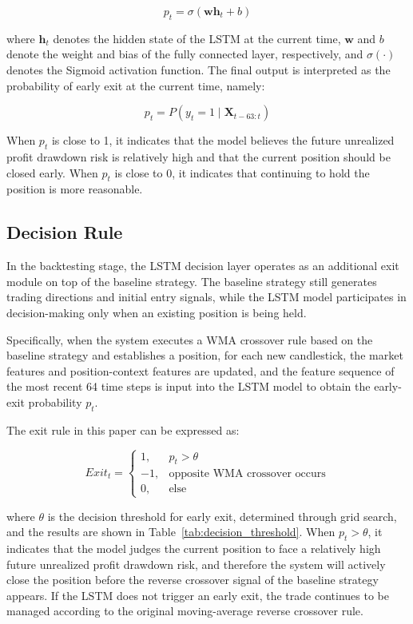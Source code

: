 \documentclass[12pt]{article}
\begin{document}
\begin{equation}
    p_t = \sigma(\mathbf{w}\mathbf{h}_t + b)
\end{equation}

where $\mathbf{h}_t$ denotes the hidden state of the LSTM at the current time, $\mathbf{w}$ and 
$b$ denote the weight and bias of the fully connected layer, respectively, and $\sigma(\cdot)$ 
denotes the Sigmoid activation function. The final output is interpreted as the probability of 
early exit at the current time, namely:

\begin{equation}
    p_t = P(y_t = 1 \mid \mathbf{X}_{t-63:t})
\end{equation}

When $p_t$ is close to 1, it indicates that the model believes the future unrealized profit 
drawdown risk is relatively high and that the current position should be closed early. When 
$p_t$ is close to 0, it indicates that continuing to hold the position is more reasonable.

\subsection{Decision Rule}

In the backtesting stage, the LSTM decision layer operates as an additional exit module on top 
of the baseline strategy. The baseline strategy still generates trading directions and initial 
entry signals, while the LSTM model participates in decision-making only when an existing 
position is being held.

Specifically, when the system executes a WMA crossover rule based on the baseline strategy and 
establishes a position, for each new candlestick, the market features and position-context 
features are updated, and the feature sequence of the most recent 64 time steps is input into 
the LSTM model to obtain the early-exit probability $p_t$.

The exit rule in this paper can be expressed as:

\begin{equation}
    Exit_t =
    \begin{cases}
    1, & p_t > \theta \\
    -1, & \text{opposite WMA crossover occurs} \\
    0, & \text{else}
    \end{cases}
\end{equation}

where $\theta$ is the decision threshold for early exit, determined through grid search, and 
the results are shown in Table~\ref{tab:decision_threshold}. When $p_t > \theta$, it indicates 
that the model judges the current position to face a relatively high future unrealized profit 
drawdown risk, and therefore the system will actively close the position before the reverse 
crossover signal of the baseline strategy appears. If the LSTM does not trigger an early exit, 
the trade continues to be managed according to the original moving-average reverse crossover 
rule.
\end{document}
